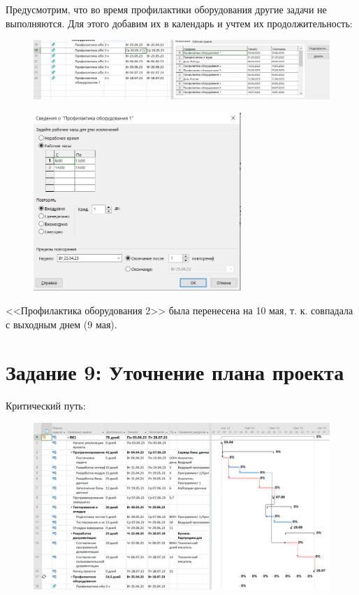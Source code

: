 Предусмотрим, что во время профилактики оборудования другие задачи не выполняются. Для этого добавим их в календарь и учтем их продолжительность:

\begin{figure}[H]
	\begin{center}
		\includegraphics[width=\textwidth]{imgs/task_8_2.png}
	\end{center}
\end{figure}

\begin{figure}[H]
	\begin{center}
		\includegraphics[width=0.7\textwidth]{imgs/task_8_3.png}
	\end{center}
\end{figure}

<<Профилактика оборудования 2>> была перенесена на 10 мая, т. к. совпадала с выходным днем (9 мая).

\section*{Задание 9: Уточнение плана проекта}

Критический путь:

\begin{figure}[H]
	\begin{center}
		\includegraphics[width=\textwidth]{imgs/task_9_0.png}
	\end{center}
\end{figure}

